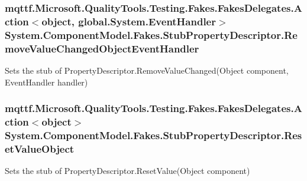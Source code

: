 \hypertarget{class_system_1_1_component_model_1_1_fakes_1_1_stub_property_descriptor_a6405bace154bf535fea9d1789284ae62}{
\subsubsection[{Remove\-Value\-Changed\-Object\-Event\-Handler}]{\setlength{\rightskip}{0pt plus 5cm}mqttf.\-Microsoft.\-Quality\-Tools.\-Testing.\-Fakes.\-Fakes\-Delegates.\-Action$<$object, global.\-System.\-Event\-Handler$>$ System.\-Component\-Model.\-Fakes.\-Stub\-Property\-Descriptor.\-Remove\-Value\-Changed\-Object\-Event\-Handler}}\label{class_system_1_1_component_model_1_1_fakes_1_1_stub_property_descriptor_a6405bace154bf535fea9d1789284ae62}


Sets the stub of Property\-Descriptor.\-Remove\-Value\-Changed(\-Object component, Event\-Handler handler)

\hypertarget{class_system_1_1_component_model_1_1_fakes_1_1_stub_property_descriptor_a812c482283892cb548afa2fbf8b6e85d}{
\subsubsection[{Reset\-Value\-Object}]{\setlength{\rightskip}{0pt plus 5cm}mqttf.\-Microsoft.\-Quality\-Tools.\-Testing.\-Fakes.\-Fakes\-Delegates.\-Action$<$object$>$ System.\-Component\-Model.\-Fakes.\-Stub\-Property\-Descriptor.\-Reset\-Value\-Object}}\label{class_system_1_1_component_model_1_1_fakes_1_1_stub_property_descriptor_a812c482283892cb548afa2fbf8b6e85d}


Sets the stub of Property\-Descriptor.\-Reset\-Value(\-Object component)

